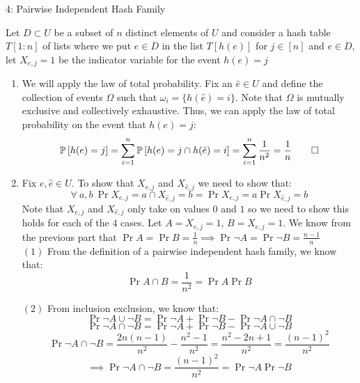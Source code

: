 \documentclass[12pt]{article}
\begin{document}
\begin{problem}{4: Pairwise Independent Hash Family}
\end{problem}
\begin{solution}
Let $D \subset U$ be a subset of $n$ distinct elements of $U$ and consider a hash table $T[1:n]$ of lists where we put $e \in D$ in the list $T[h(e)]$ for $j\in [n]$ and $e\in D$, let $X_{e,j}=1$ be the indicator variable for the event $h(e) = j$
\begin{enumerate}[label=(\alph*)]
\item We will apply the law of total probability. Fix an $\hat{e} \in U$ and define the collection of events $\Omega$ such that $\omega_i =\{h(\hat{e}) = i\}$. Note that $\Omega$ is mutually exclusive and collectively exhaustive. Thus, we can apply the law of total probability on the event that $h(e) = j$:
\[
\Pr{h(e) = j} = \sum_{i=1}^{n}{\Pr{h(e) = j \cap h(\hat{e}) = i }} = \sum_{i=1}^{n}{\frac{1}{n^2}} = \frac{1}{n} \qed
\]
\item Fix $e, \hat{e} \in U$. To show that $X_{e,j}$ and $X_{\hat{e},j}$ we need to show that:
\[
\forall~a,b~ \Pr{X_{e,j}=a \cap X_{\hat{e},j}=b} = \Pr{X_{e,j}=a} \Pr{X_{\hat{e},j}=b}
\]
Note that $X_{e,j}$ and $X_{\hat{e},j}$ only take on values $0$ and $1$ so we need to show this holds for each of the $4$ cases. Let $A = X_{e,j}=1$, $B = X_{e,j}=1$. We know from the previous part that $\Pr{A} = \Pr{B} = \frac{1}{n} \implies \Pr{\neg A} = \Pr{\neg B} = \frac{n-1}{n}$\\

$(1)$ From the definition of a pairwise independent hash family, we know that:
\[
\Pr{A \cap B} = \frac{1}{n^2} =\Pr{A}\Pr{B}
\]

$(2)$ From inclusion exclusion, we know that:
\[
\Pr{\neg A \cup \neg B} = \Pr{\neg A} + \Pr{\neg B} -\Pr{\neg A \cap \neg B}
\]
\[
\Pr{\neg A \cap \neg B} = \Pr{\neg A} + \Pr{\neg B} - \Pr{\neg A \cup \neg B}
\]
\[
\Pr{\neg A \cap \neg B} = \frac{2n(n-1)}{n^2}- \frac{n^2-1}{n^2} = \frac{n^2 - 2n + 1}{n^2} = \frac{(n-1)^2}{n^2}
\]
\[
\implies \Pr{\neg A \cap \neg B} = \frac{(n-1)^2}{n^2} = \Pr{\neg A}\Pr{\neg B} 
\]


\end{enumerate}
\end{solution}
\end{document}
